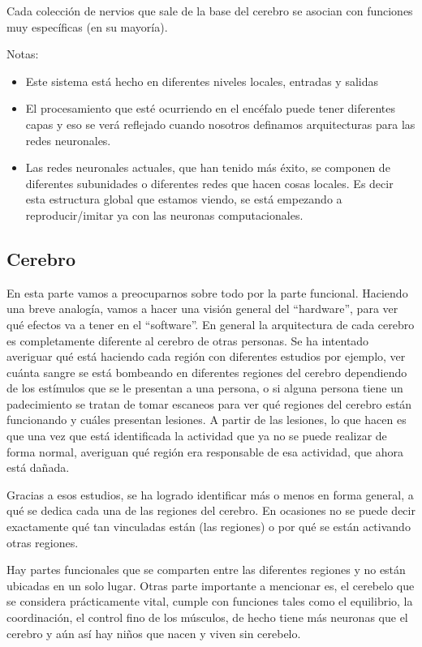  Cada colección de nervios que sale de la base del cerebro se asocian con funciones muy específicas (en su mayoría). 
 
 Notas:
 
 \begin{itemize}
  \item Este sistema está hecho en diferentes niveles locales, entradas y salidas  
  \item El procesamiento que esté ocurriendo en el encéfalo puede tener diferentes capas y eso se verá reflejado cuando nosotros definamos arquitecturas para las redes neuronales. 
  \item Las redes neuronales actuales, que han tenido más éxito, se componen de diferentes subunidades o diferentes redes que hacen cosas locales. Es decir esta estructura global que estamos viendo,  se está empezando a reproducir/imitar ya con las neuronas computacionales.

 \end{itemize}


\subsection{Cerebro}

En esta parte vamos a preocuparnos sobre todo por la parte funcional. Haciendo una breve analogía, vamos a hacer una visión general del “hardware”, para ver qué efectos va a tener en el “software”. 
En general la arquitectura de cada cerebro es completamente diferente al cerebro de otras personas. Se ha intentado averiguar qué está haciendo cada región con diferentes estudios por ejemplo,  ver cuánta sangre se está bombeando en diferentes regiones del cerebro dependiendo de los estímulos que se le presentan a una persona, o si alguna persona tiene un padecimiento se tratan de tomar escaneos para ver qué regiones del cerebro están funcionando y cuáles presentan lesiones. A partir de las lesiones, lo que hacen es que una vez que está identificada la actividad que ya no se puede realizar de forma normal, averiguan qué región era responsable de esa actividad, que ahora está dañada.

Gracias a esos estudios, se ha logrado identificar más o menos en forma general, a qué se dedica cada una de las regiones del cerebro. En ocasiones no se puede decir exactamente qué tan vinculadas están (las regiones) o por qué se están activando otras regiones.

Hay partes funcionales que se comparten entre las diferentes regiones y no están ubicadas en un solo lugar. Otras parte importante a mencionar es, el cerebelo que se considera prácticamente vital, cumple con funciones tales como el equilibrio, la coordinación, el control fino de los músculos, de hecho tiene más neuronas que el cerebro y aún así hay niños que nacen y viven sin cerebelo. 


